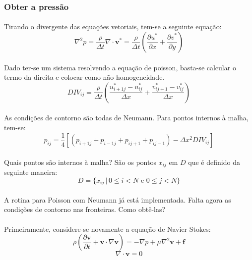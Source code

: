 \documentclass[poisson.tex]{subfiles}
\begin{document}
\subsubsection{Obter a pressão}
\paragraph{} Tirando o divergente das equações vetoriais, tem-se a seguinte equação:
\begin{equation}
\nabla^2 p = \frac{\rho}{\Delta t} \nabla\cdot \textbf{v}^*=\frac{\rho}{\Delta t} 
\left( \frac{\partial u^*}{\partial x}+\frac{\partial v^*}{\partial y} \right)
\end{equation}
\paragraph{} Dado ter-se um sistema resolvendo a equação de poisson, basta-se calcular o termo da direita e colocar como não-homogeneidade.
\begin{equation}
DIV_{ij}=\frac{\rho}{\Delta t}\left( \frac{u_{i+1j}^*-u_{ij}^*}{\Delta x}+\frac{v_{ij+1}^*-v_{ij}^*}{\Delta x}\right)
\end{equation}
\paragraph{} As condições de contorno são todas de Neumann. Para pontos internos à malha, tem-se:
\begin{equation}
p_{ij}=\frac{1}{4}[(p_{i+1j}+p_{i-1j}+p_{ij+1}+p_{ij-1})-\Delta x^2 DIV_{ij}]
\end{equation}
\paragraph{} Quais pontos são internos à malha? São os pontos $x_{ij}$ em $D$ que é definido da seguinte maneira:
\begin{equation}
D = \{x_{ij}\,|\, 0\le i < N \textrm{ e } 0\le j < N \}
\end{equation}
\paragraph{} A rotina para Poisson com Neumann já está implementada. Falta agora
as condições de contorno nas fronteiras. Como obtê-las?
\paragraph{} Primeiramente, considere-se novamente a equação de Navier Stokes:
\[\rho\left( \frac{\partial \textbf{v}}{\partial t}+\textbf{v}\cdot\nabla\textbf{v}\right)=-\nabla p+\mu\nabla^2\textbf{v}+\textbf{f}\]
\[\nabla\cdot\textbf{v}=0\]
\end{document}
